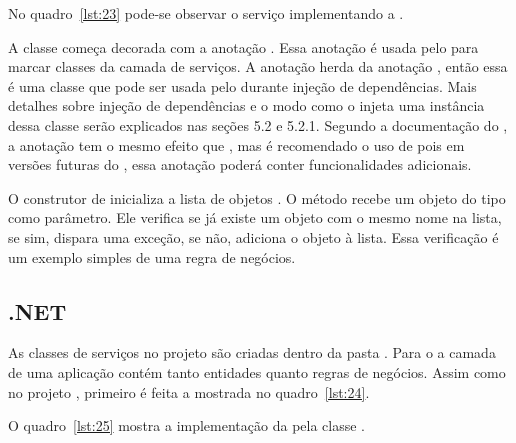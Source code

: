 
No quadro~\ref{lst:23} pode-se observar o serviço  implementando a  .


A classe  começa decorada com a anotação . Essa anotação é usada pelo  para marcar classes da camada de serviços. A anotação  herda da anotação , então essa é uma classe que pode ser usada pelo  durante injeção de dependências. Mais detalhes sobre injeção de dependências e o modo como o  injeta uma instância dessa classe serão explicados nas seções 5.2 e 5.2.1. Segundo a documentação do , a anotação  tem o mesmo efeito que , mas é recomendado o uso de  pois em versões futuras do , essa anotação poderá conter funcionalidades adicionais.

O construtor de  inicializa a lista de objetos . O método  recebe um objeto do tipo  como parâmetro. Ele verifica se já existe um objeto com o mesmo nome na lista, se sim, dispara uma exceção, se não, adiciona o objeto à lista. Essa verificação é um exemplo simples de uma regra de negócios.

\subsection{.NET}

As classes de serviços no projeto  são criadas dentro da pasta . Para o  a camada  de uma aplicação  contém tanto entidades quanto regras de negócios. Assim como no projeto , primeiro é feita a   mostrada no quadro~\ref{lst:24}.


O quadro~\ref{lst:25} mostra a implementação da  pela classe .


